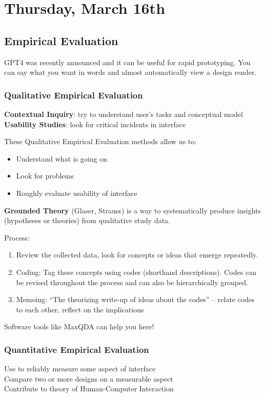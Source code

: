 \section{Thursday, March 16th}
\subsection{Empirical Evaluation}
GPT4 was recently announced and it can be useful for rapid prototyping. You can say what you want in words and almost automatically view a design render.

\subsubsection{Qualitative Empirical Evaluation}
\textbf{Contextual Inquiry}: try to understand user’s tasks and conceptual model\\
\textbf{Usability Studies}: look for critical incidents in interface

These Qualitative Empirical Evaluation methods allow us to:
\begin{itemize}
    \item Understand what is going on
    \item Look for problems
    \item Roughly evaluate usability of interface
\end{itemize}

\textbf{Grounded Theory} (Glaser, Strauss) is a way to systematically produce
insights (hypotheses or theories) from qualitative study data.

Process:
\begin{enumerate}
    \item  Review the collected data, look for concepts or ideas that emerge repeatedly.
    \item Coding: Tag these concepts using codes (shorthand descriptions). 
    Codes can be revised throughout the process and can also be hierarchically grouped.
    \item Memoing: “The theorizing write-up of ideas about the codes” – relate codes to each other, reflect on the implications
\end{enumerate}

Software tools like MaxQDA can help you here!

\subsubsection{Quantitative Empirical Evaluation}
Use to reliably measure some aspect of interface\\
Compare two or more designs on a measurable aspect\\
Contribute to theory of Human-Computer Interaction

